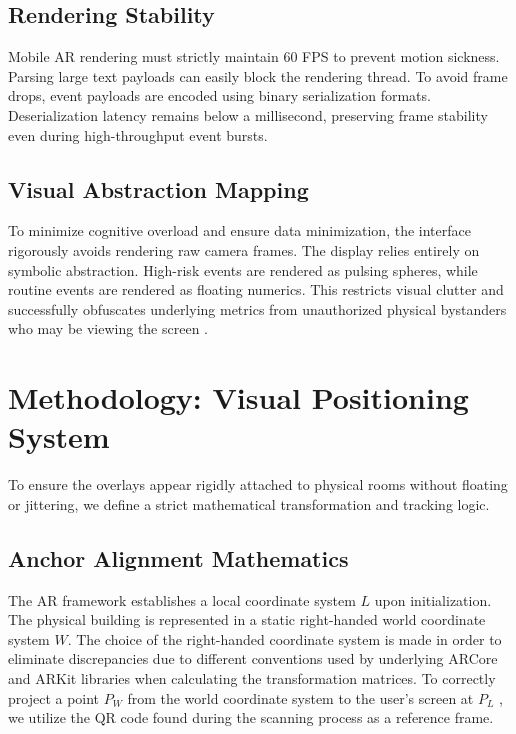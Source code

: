 \documentclass[conference]{IEEEtran}
\begin{document}
\subsection{Rendering Stability}
Mobile AR rendering must strictly maintain 60 FPS to prevent motion sickness. Parsing large text payloads can easily block the rendering thread. To avoid frame drops, event payloads are encoded using binary serialization formats. Deserialization latency remains below a millisecond, preserving frame stability even during high-throughput event bursts.

\subsection{Visual Abstraction Mapping}
To minimize cognitive overload and ensure data minimization, the interface rigorously avoids rendering raw camera frames. The display relies entirely on symbolic abstraction. High-risk events are rendered as pulsing spheres, while routine events are rendered as floating numerics. This restricts visual clutter and successfully obfuscates underlying metrics from unauthorized physical bystanders who may be viewing the screen \cite{b22}.

\section{Methodology: Visual Positioning System}

To ensure the overlays appear rigidly attached to physical rooms without floating or jittering, we define a strict mathematical transformation and tracking logic.

\subsection{Anchor Alignment Mathematics}
The AR framework establishes a local coordinate system $L$ upon initialization. The physical building is represented in a static right-handed world coordinate system $W$. The choice of the right-handed coordinate system is made in order to eliminate discrepancies due to different conventions used by underlying ARCore and ARKit libraries when calculating the transformation matrices. To correctly project a point $P_W$ from the world coordinate system to the user’s screen at $P_L$ , we utilize the QR code found during the scanning process as a reference frame.
\end{document}
